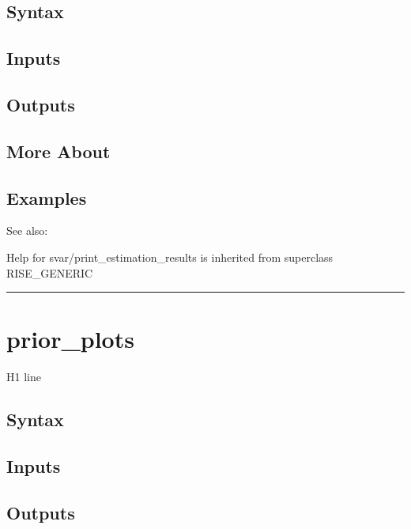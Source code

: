 \documentclass[letterpaper,10pt,english]{sphinxmanual}
\begin{document}
\subsection{Syntax}
\label{classes/models/@svar/svar:id97}

\subsection{Inputs}
\label{classes/models/@svar/svar:id98}

\subsection{Outputs}
\label{classes/models/@svar/svar:id99}

\subsection{More About}
\label{classes/models/@svar/svar:id100}

\subsection{Examples}
\label{classes/models/@svar/svar:id101}
See also:

Help for svar/print\_estimation\_results is inherited from superclass RISE\_GENERIC


\bigskip\hrule{}\bigskip



\section{prior\_plots}
\label{classes/models/@svar/svar:id102}\label{classes/models/@svar/svar:prior-plots}
H1 line


\subsection{Syntax}
\label{classes/models/@svar/svar:id103}

\subsection{Inputs}
\label{classes/models/@svar/svar:id104}

\subsection{Outputs}
\label{classes/models/@svar/svar:id105}
\end{document}
